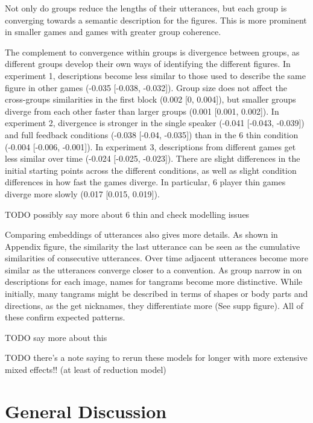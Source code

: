 \documentclass[
  english,
  a4paper,
]{article}
\begin{document}
Not only do groups reduce the lengths of their utterances, but each group is converging towards a semantic description for the figures. This is more prominent in smaller games and games with greater group coherence.

The complement to convergence within groups is divergence between groups, as different groups develop their own ways of identifying the different figures. In experiment 1, descriptions become less similar to those used to describe the same figure in other games (-0.035 {[}-0.038, -0.032{]}). Group size does not affect the cross-groups similarities in the first block (0.002 {[}0, 0.004{]}), but smaller groups diverge from each other faster than larger groups (0.001 {[}0.001, 0.002{]}). In experiment 2, divergence is stronger in the single speaker (-0.041 {[}-0.043, -0.039{]}) and full feedback conditions (-0.038 {[}-0.04, -0.035{]}) than in the 6 thin condition (-0.004 {[}-0.006, -0.001{]}). In experiment 3, descriptions from different games get less similar over time (-0.024 {[}-0.025, -0.023{]}). There are slight differences in the initial starting points across the different conditions, as well as slight condition differences in how fast the games diverge. In particular, 6 player thin games diverge more slowly (0.017 {[}0.015, 0.019{]}).

TODO possibly say more about 6 thin and check modelling issues

Comparing embeddings of utterances also gives more details. As shown in Appendix figure, the similarity the last utterance can be seen as the cumulative similarities of consecutive utterances. Over time adjacent utterances become more similar as the utterances converge closer to a convention. As group narrow in on descriptions for each image, names for tangrams become more distinctive. While initially, many tangrams might be described in terms of shapes or body parts and directions, as the get nicknames, they differentiate more (See supp figure). All of these confirm expected patterns.

TODO say more about this

TODO there's a note saying to rerun these models for longer with more extensive mixed effects!! (at least of reduction model)

\hypertarget{general-discussion}{%
\section{General Discussion}\label{general-discussion}}
\end{document}
